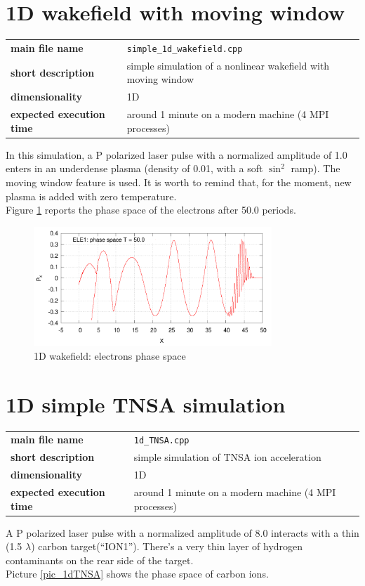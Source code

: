\documentclass[11pt,a4paper]{report}
\begin{document}
\section{1D wakefield with moving window}
\begin{center}
    \begin{tabular}{ l | l }
    	\textbf{main file name} & \verb+simple_1d_wakefield.cpp+\\
    	\textbf{short description} & simple simulation of a nonlinear wakefield with moving window \\
    	\textbf{dimensionality} & 1D  \\
    	\textbf{expected execution time} & around 1 minute on a modern machine (4 MPI processes)
    \end{tabular}
    \end{center}
In this simulation, a P polarized laser pulse with a normalized amplitude of 1.0 enters in an underdense plasma (density of 0.01, with a soft $\sin^2$ ramp). The moving window feature is used. It is worth to remind that, for the moment, new plasma is added with zero temperature.\\
Figure \ref{pic_1dwake} reports the phase space of the electrons after 50.0 periods.
    
    \begin{figure}[htbp]
    \centering
    \includegraphics[width=0.80\textwidth]{wake.png}
    \caption{1D wakefield: electrons phase space}
	\label{pic_1dwake}    
    \end{figure}    

\section{1D simple TNSA simulation}
\begin{center}
    \begin{tabular}{ l | l }
    	\textbf{main file name} & \verb+1d_TNSA.cpp+\\
    	\textbf{short description} & simple simulation of TNSA ion acceleration\\
    	\textbf{dimensionality} & 1D  \\
    	\textbf{expected execution time} & around 1 minute on a modern machine (4 MPI processes)
    \end{tabular}
    \end{center}
A P polarized laser pulse with a normalized amplitude of 8.0 interacts with a thin (1.5 $\lambda$) carbon target(``ION1''). There's a very thin layer of hydrogen contaminants on the rear side of the target.\\
Picture \ref{pic_1dTNSA} shows the phase space of carbon ions.
    
\end{document}

